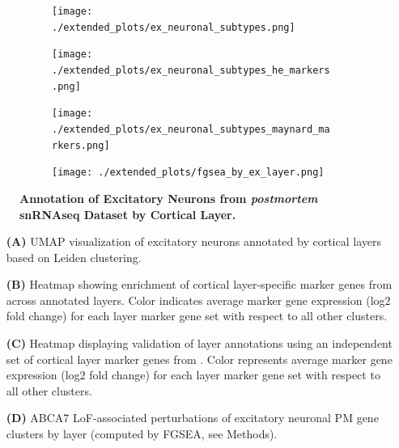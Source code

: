 \documentclass[12pt]{article}
\begin{document}
\begin{figure}[H]
    \begin{subfigure}[t]{.3\textwidth}
        \caption{}
        \texttt{[image: ./extended\_plots/ex\_neuronal\_subtypes.png]}        
    \end{subfigure}
    \begin{subfigure}[t]{.3\textwidth}
        \caption{}
        \texttt{[image: ./extended\_plots/ex\_neuronal\_subtypes\_he\_markers.png]}        
    \end{subfigure}
    \begin{subfigure}[t]{.3\textwidth}
        \caption{}
        \texttt{[image: ./extended\_plots/ex\_neuronal\_subtypes\_maynard\_markers.png]}        
    \end{subfigure}
    \begin{subfigure}[t]{0.8\textwidth}
        \caption{}
        \texttt{[image: ./extended\_plots/fgsea\_by\_ex\_layer.png]}        
    \end{subfigure}
    \caption{
        \textbf{Annotation of Excitatory Neurons from \textit{postmortem} snRNAseq Dataset by Cortical Layer.}\\
    }
    \label{fig:ex_layers}
\end{figure}
\begin{itemize}
    \item[\textbf{(A)}] UMAP visualization of excitatory neurons annotated by cortical layers based on Leiden clustering. 
    \item[\textbf{(B)}] Heatmap showing enrichment of cortical layer-specific marker genes from \cite{He2017-dq} across annotated layers. Color indicates average marker gene expression (log2 fold change) for each layer marker gene set with respect to all other clusters.    
    \item[\textbf{(C)}] Heatmap displaying validation of layer annotations using an independent set of cortical layer marker genes from \cite{Maynard2021-mz}. Color represents average marker gene expression (log2 fold change) for each layer marker gene set with respect to all other clusters.
    \item[\textbf{(D)}] ABCA7 LoF-associated perturbations of excitatory neuronal PM gene clusters by layer (computed by FGSEA, see Methods).
\end{itemize} \clearpage
\end{document}
